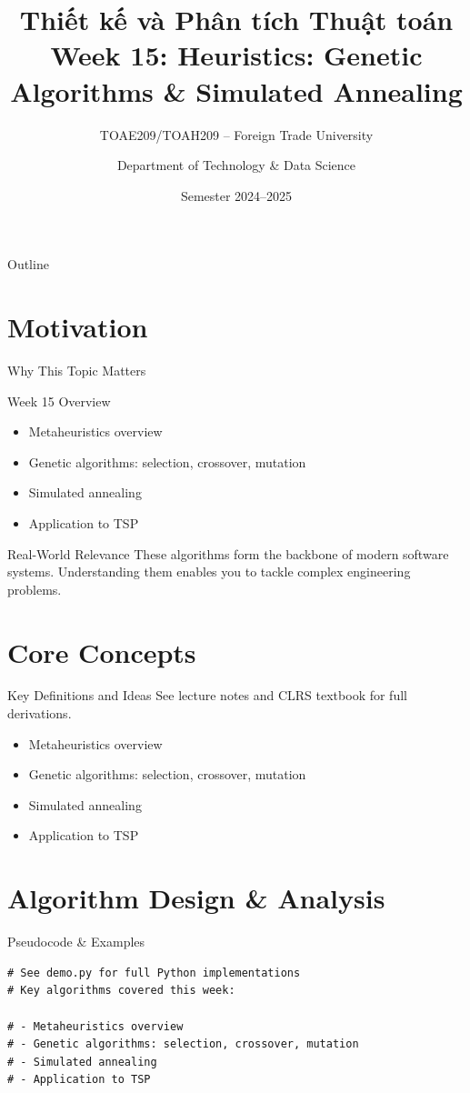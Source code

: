 \documentclass[aspectratio=169,xcolor=dvipsnames]{beamer}
\title[Algorithms -- Week 15]{\textbf{Thiết kế và Phân tích Thuật toán}\\
  \large Week 15: Heuristics: Genetic Algorithms & Simulated Annealing}
\subtitle{TOAE209/TOAH209 -- Foreign Trade University}
\author{Department of Technology \& Data Science}
\date{Semester 2024--2025}
\begin{document}
\begin{frame}\titlepage\end{frame}
\begin{frame}{Outline}\tableofcontents\end{frame}

\section{Motivation}
\begin{frame}{Why This Topic Matters}
  \begin{block}{Week 15 Overview}
    \begin{itemize}
    \item Metaheuristics overview
    \item Genetic algorithms: selection, crossover, mutation
    \item Simulated annealing
    \item Application to TSP
    \end{itemize}
  \end{block}
  \begin{exampleblock}{Real-World Relevance}
    These algorithms form the backbone of modern software systems.
    Understanding them enables you to tackle complex engineering problems.
  \end{exampleblock}
\end{frame}

\section{Core Concepts}
\begin{frame}{Key Definitions and Ideas}
  See lecture notes and CLRS textbook for full derivations.
  \begin{itemize}
    \item Metaheuristics overview
    \item Genetic algorithms: selection, crossover, mutation
    \item Simulated annealing
    \item Application to TSP
  \end{itemize}
\end{frame}

\section{Algorithm Design \& Analysis}
\begin{frame}[fragile]{Pseudocode \& Examples}
  \begin{lstlisting}
# See demo.py for full Python implementations
# Key algorithms covered this week:

# - Metaheuristics overview
# - Genetic algorithms: selection, crossover, mutation
# - Simulated annealing
# - Application to TSP
  \end{lstlisting}
\end{frame}
\end{document}

